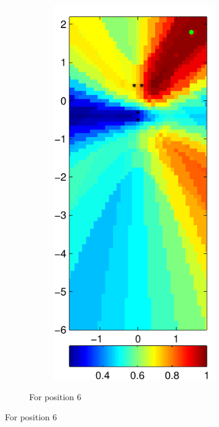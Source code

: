 \documentclass[spanish,openright]{book}
\newcommand{\verticalSpacingSRPMaps}{-0.3cm}
\begin{document}
\begin{figure}
\begin{subfigure}[t]{0.47\textwidth}
\begin{minipage}[t]{\textwidth}
\begin{subfigure}[t]{0.3\textwidth}
\label{fig:SRP_pos06}
      \end{subfigure}
\begin{subfigure}[t]{0.3\textwidth}
        \includegraphics[width=\textwidth]{SRP_Fo1500_mean_pos06}
\label{fig:SRP_Fo1500_mean_pos06}
      \end{subfigure}
      \vspace{\verticalSpacingSRPMaps}
      \caption{\centering For position 6}
      \vspace{0.25cm}
    \end{minipage}
  \end{subfigure}


\end{figure}
\end{document}
